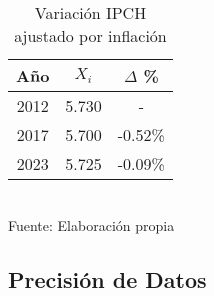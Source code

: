 \documentclass[12pt]{article} %
\begin{document}
\begin{table}[H]
    \centering
    \caption{Variación IPCH ajustado por inflación}
    \vspace{0.2cm}
    \begin{tabular}{|c|c|c|}
        \hline
        Año & $X_i$ & $\Delta$ \% \\
        \hline
        2012 & 5.730 & - \\
        2017 & 5.700 & -0.52\% \\
        2023 & 5.725 & -0.09\% \\
        \hline
    \end{tabular}
    \vspace{0.2cm}
    \label{VariacionIPCH}
    \\Fuente: Elaboración propia
\end{table}

\subsection{Precisión de Datos} \label{sec:Precision}
\end{document}
